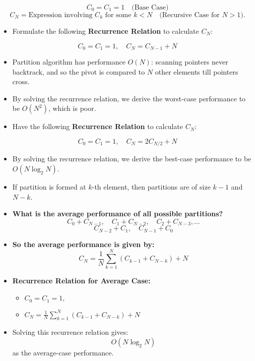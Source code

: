 \documentclass[a4paper,12pt]{article}
\begin{document}
\[
C_0 = C_1 = 1 \quad \text{(Base Case)}
\]
\[
C_N = \text{Expression involving } C_k \text{ for some } k < N \quad \text{(Recursive Case for \(N > 1\))}.
\]

\begin{itemize}
    \item Formulate the following \textbf{Recurrence Relation} to calculate \(C_N\):
\end{itemize}

\[
C_0 = C_1 = 1, \quad C_N = C_{N-1} + N
\]

\begin{itemize}
    \item Partition algorithm has performance \(O(N)\): scanning pointers never backtrack, and so the pivot is compared to \(N\) other elements till pointers cross.
    \item By solving the recurrence relation, we derive the worst-case performance to be \(O(N^2)\), which is poor.
\end{itemize}

\begin{itemize}
    \item Have the following \textbf{Recurrence Relation} to calculate \(C_N\):
\end{itemize}

\[
C_0 = C_1 = 1, \quad C_N = 2C_{N/2} + N
\]

\begin{itemize}
    \item By solving the recurrence relation, we derive the best-case performance to be \(O(N \log_2 N)\).
\end{itemize}

\begin{itemize}
    \item If partition is formed at \(k\)-th element, then partitions are of size \(k-1\) and \(N-k\).
    \item \textbf{What is the average performance of all possible partitions?}
    \[
    C_0 + C_{N-1}, \quad C_1 + C_{N-2}, \quad C_2 + C_{N-3}, \dots
    \]
    \[
    C_{N-2} + C_1, \quad C_{N-1} + C_0
    \]
    \item \textbf{So the average performance is given by:}
    \[
    C_N = \frac{1}{N} \sum_{k=1}^{N} (C_{k-1} + C_{N-k}) + N
    \]
\end{itemize}

\begin{itemize}
    \item \textbf{Recurrence Relation for Average Case:}
    \begin{itemize}
        \item \(C_0 = C_1 = 1,\)
        \item \(C_N = \frac{1}{N} \sum_{k=1}^{N} (C_{k-1} + C_{N-k}) + N\)
    \end{itemize}
    \item Solving this recurrence relation gives:
    \[
    O(N \log_2 N)
    \]
    as the average-case performance.
\end{itemize}
\end{document}
